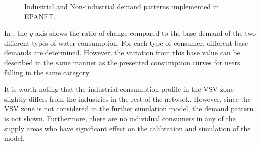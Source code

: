 \begin{figure}[H]
\centering

\caption{Industrial and Non-industrial demand patterns implemented in EPANET.}
\label{fig:demandpatterns_EPANET}
\end{figure}

\vspace{-3mm}

In , the $y$-axis shows the ratio of change compared to the base demand of the two different types of water consumption. For each type of consumer, different base demands are determined. However, the variation from this base value can be described in the same manner as the presented consumption curves for users falling in the same category. 

It is worth noting that the industrial consumption profile in the VSV zone slightly differs from the industries in the rest of the network. However, since the VSV zone is not considered in the further simulation model, the demand pattern is not shown. Furthermore, there are no individual consumers in any of the supply areas who have significant effect on the calibration and simulation of the model. 



